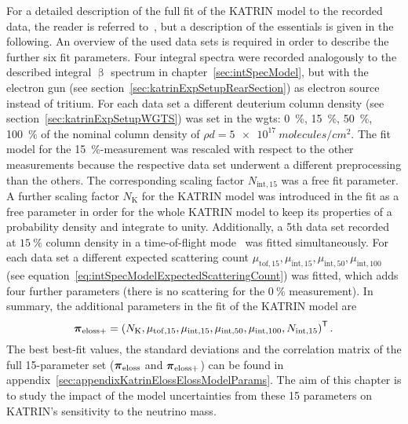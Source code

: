 For a detailed description of the full fit of the KATRIN model to the recorded data, the reader is referred to~\cite{Hannen2019_1}, but a description of the essentials is given in the following. An overview of the used data sets is required in order to describe the further six fit parameters. Four integral spectra were recorded analogously to the described integral $\upbeta$ spectrum in chapter~\ref{sec:intSpecModel}, but with the electron gun (see section~\ref{sec:katrinExpSetupRearSection}) as electron source instead of tritium. For each data set a different deuterium column density (see section~\ref{sec:katrinExpSetupWGTS}) was set in the \gls{wgts}: \SI{0}{\percent}, \SI{15}{\percent}, \SI{50}{\percent}, \SI{100}{\percent} of the nominal column density of $\rho d = \SI{5e17}{molecules/cm^2}$. The fit model for the \mbox{\SI{15}{\percent}-measurement} was rescaled with respect to the other measurements because the respective data set underwent a different preprocessing than the others. The corresponding scaling factor $N_{\mathrm{int},15}$ was a free fit parameter. A further scaling factor $N_\mathrm{K}$ for the KATRIN model was introduced in the fit as a free parameter in order for the whole KATRIN model to keep its properties of a probability density and integrate to unity. Additionally, a 5th data set recorded at $\SI{15}{\percent}$ column density in a time-of-flight mode~\cite{Bonn1999} was fitted simultaneously. For each data set a different expected scattering count $
\mu_{\mathrm{tof},15}, 
\mu_{\mathrm{int},15},  
\mu_{\mathrm{int},50},  
\mu_{\mathrm{int},100}$ (see equation~\ref{eq:intSpecModelExpectedScatteringCount}) was fitted, which adds four further parameters (there is no scattering for the $\SI{0}{\percent}$ measurement). In summary, the additional parameters in the fit of the KATRIN model are
\begin{equation}
\label{eq:katrinElossElossModelExtendedParams}
	\boldsymbol{\mathbf{\pi}}_\mathrm{eloss+} = 
	{\left(
		N_\mathrm{K},
		\mu_{\mathrm{tof},15},
		\mu_{\mathrm{int},15}, 
		\mu_{\mathrm{int},50}, 
		\mu_{\mathrm{int},100},
		N_{\mathrm{int},15}
		\right)}^{\mathsf{T}}
	\text{\,.}
\end{equation}
The best best-fit values, the standard deviations and the correlation matrix of the full 15-parameter set ($\boldsymbol{\mathbf{\pi}}_\mathrm{eloss}$ and $\boldsymbol{\mathbf{\pi}}_\mathrm{eloss+}$) can be found in appendix~\ref{sec:appendixKatrinElossElossModelParams}. The aim of this chapter is to study the impact of the model uncertainties from these 15 parameters on KATRIN's sensitivity to the neutrino mass.

